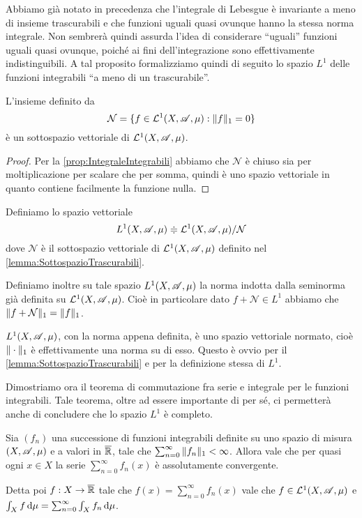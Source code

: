 Abbiamo già notato in precedenza che l'integrale di Lebesgue è invariante a meno di insieme trascurabili e che funzioni uguali quasi ovunque hanno la stessa norma integrale. Non sembrerà quindi assurda l'idea di considerare ``uguali'' funzioni uguali quasi ovunque, poiché ai fini dell'integrazione sono effettivamente indistinguibili. A tal proposito formalizziamo quindi di seguito lo spazio $L^1$ delle funzioni integrabili ``a meno di un trascurabile''.

\begin{lemma}\label{lemma:SottospazioTrascurabili}
	L'insieme definito da
	\begin{equation*}
		\mathcal{N}=\{ f\in\mathcal L^1(X,\mathscr A,\mu) : \Vert f\Vert_1=0\}
	\end{equation*}
	è un sottospazio vettoriale di $\mathcal L^1(X,\mathscr A,\mu)$.
\end{lemma}
\begin{proof}
	Per la \cref{prop:IntegraleIntegrabili} abbiamo che $\mathcal{N}$ è chiuso sia per moltiplicazione per scalare che per somma, quindi è uno spazio vettoriale in quanto contiene facilmente la funzione nulla.
\end{proof}

\begin{definition}
	Definiamo lo spazio vettoriale
	\begin{equation*}
		L^1(X,\mathscr A,\mu)\doteqdot \mathcal L^1(X,\mathscr A,\mu)/\mathcal{N}
	\end{equation*}
	dove $\mathcal{N}$ è il sottospazio vettoriale di $\mathcal L^1(X,\mathscr A,\mu)$ definito nel \cref{lemma:SottospazioTrascurabili}.
	
	Definiamo inoltre su tale spazio $L^1(X,\mathscr A,\mu)$ la norma indotta dalla seminorma già definita su $\mathcal L^1(X,\mathscr A,\mu)$. Cioè in particolare dato $f+\mathcal{N}\in L^1$ abbiamo che $\Vert f+\mathcal{N}\Vert_1=\Vert f\Vert_1$.
\end{definition}

\begin{remark}
	$L^1(X,\mathscr A,\mu)$, con la norma appena definita, è uno spazio vettoriale normato, cioè $\Vert \cdot\Vert_1$ è effettivamente una norma su di esso. Questo è ovvio per il \cref{lemma:SottospazioTrascurabili} e per la definizione stessa di $L^1$.
\end{remark}

Dimostriamo ora il teorema di commutazione fra serie e integrale per le funzioni integrabili. Tale teorema, oltre ad essere importante di per sé, ci permetterà anche di concludere che lo spazio $L^1$ è completo.

\begin{theorem}\label{thm:IntegrazionePerSerie}
	Sia $(f_n)$ una successione di funzioni integrabili definite su uno spazio di misura $(X,\mathscr A,\mu)$ e a valori in $\overline{\mathbb R}$, tale che $\sum_{n=0}^{\infty}\Vert f_n\Vert_1<\infty$. Allora vale che per quasi ogni $x\in X$ la serie $\sum_{n=0}^\infty f_n(x)$ è assolutamente convergente. 
	
	Detta poi $f:X\to\overline{\mathbb R}$ tale che $f(x)=\sum_{n=0}^\infty f_n(x)$ vale che $f\in \mathcal L^1(X,\mathscr A,\mu)$ e $\int_X f\,\mathrm d\mu=\sum_{n=0}^\infty \int_X f_n\,\mathrm d\mu$.
\end{theorem}

